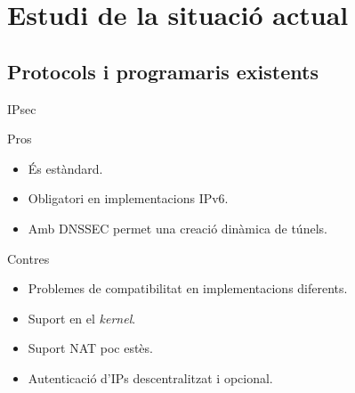\section{Estudi de la situació actual}
\subsection{Protocols i programaris existents}
    \begin{frame}{IPsec}
	\begin{exampleblock}{Pros}\small
    	\begin{itemize}
\item És estàndard.
\item Obligatori en implementacions IPv6.
\item Amb DNSSEC permet una creació dinàmica de túnels.
		\end{itemize}
	\end{exampleblock}
	\begin{alertblock}{Contres}\small
	\begin{itemize}
\item Problemes de compatibilitat en implementacions diferents.
\item Suport en el \emph{kernel}.
\item Suport NAT poc estès.
\item Autenticació d'IPs descentralitzat i opcional.
		\end{itemize}
	\end{alertblock}
    \end{frame}
